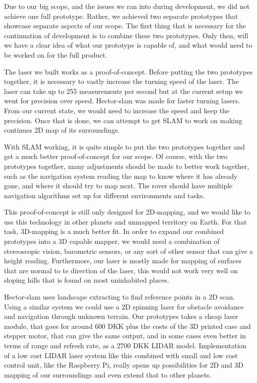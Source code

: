 Due to our big scope, and the issues we ran into during development, we did not achieve one full prototype. Rather, we achieved two separate prototypes that showcase separate aspects of our scope. The first thing that is necessary for the continuation of development is to combine these two prototypes. Only then, will we have a clear idea of what our prototype is capable of, and what would need to be worked on for the full product.

The laser we built works as a proof-of-concept. Before putting the two prototypes together, it is necessary to vastly increase the turning speed of the laser. The laser can take up to 255 measurements per second but at the current setup we went for precision over speed. Hector-slam was made for faster turning lasers. From our current state, we would need to increase the speed and keep the precision. Once that is done, we can attempt to get SLAM to work on making continues 2D map of its surroundings.

With SLAM working, it is quite simple to put the two prototypes together and get a much better proof-of-concept for our scope. Of course, with the two prototypes together, many adjustments should be made to better work together, such as the navigation system reading the map to know where it has already gone, and where it should try to map next. The rover should have multiple navigation algorithms set up for different environments and tasks. 

This proof-of-concept is still only designed for 2D-mapping, and we would like to use this technology in other planets and unmapped territory on Earth. For that task, 3D-mapping is a much better fit. In order to expand our combined prototypes into a 3D capable mapper, we would need a combination of stereoscopic vision, barometric sensors, or any sort of other sensor that can give a height reading. Furthermore, our laser is mostly made for mapping of surfaces that are normal to te direction of the laser, this would not work very well on sloping hills that is found on most uninhabited places.

Hector-slam uses landscape extracting to find reference points in a 2D scan. Using a similar system we could use a 2D spinning laser for obstacle avoidance and navigation through unknown terrain. Our prototypes takes a cheap laser module, that goes for around 600 DKK\cite{lidarl} plus the costs of the 3D printed case and stepper motor, that can give the same output, and in some cases even better in terms of range and refresh rate, as a 2700 DKK\cite{lidar360} LIDAR model. Implementation of a low cost LIDAR laser system like this combined with small and low cost control unit, like the Raspberry Pi, really opens up possibilities for 2D and 3D mapping of our surroundings and even extend that to other planets. 